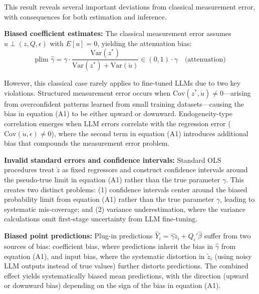 \documentclass[11pt]{article}
\begin{document}
This result reveals several important deviations from classical measurement error, with consequences for both estimation and inference.

\textbf{Biased coefficient estimates:} The classical measurement error assumes $u \perp (z, Q, \epsilon)$ with $E[u] = 0$,
yielding the attenuation bias:
\begin{equation}
\text{plim } \hat{\gamma} = \gamma \cdot \frac{\text{Var}(z^*)}{\text{Var}(z^*) + \text{Var}(\dot{u})} \in (0,1) \cdot \gamma \quad \text{(attenuation)} \tag{A2}
\end{equation}

However, this classical case rarely applies to fine-tuned LLMs due to two key violations. 
Structured measurement error occurs when $\text{Cov}(z^*, \dot{u}) \neq 0$—arising from overconfident 
patterns learned from small training datasets—causing the bias in equation (A1) to be either upward or downward. 
Endogeneity-type correlation emerges when LLM errors correlate with the regression error ($\text{Cov}(\dot{u}, \dot{\epsilon}) \neq 0$), 
where the second term in equation (A1) introduces additional bias that compounds the measurement error problem.

\textbf{Invalid standard errors and confidence intervals:} Standard OLS procedures treat $\dot{z}$ as fixed regressors and construct confidence intervals 
around the pseudo-true limit in equation (A1) rather than the true parameter $\gamma$. 
This creates two distinct problems: (1) confidence intervals center around the biased probability limit from equation (A1)
rather than the true parameter $\gamma$, leading to systematic mis-coverage; and (2) variance underestimation,
where the variance calculations omit first-stage uncertainty from LLM fine-tuning.

\textbf{Biased point predictions:} Plug-in predictions $\hat{Y}_i = \hat{\gamma} \tilde{z}_i + Q_i'\hat{\beta}$ 
suffer from two sources of bias: coefficient bias, where predictions inherit the bias in $\hat{\gamma}$ from equation (A1),
and input bias, where the systematic distortion in $\tilde{z}_i$
(using noisy LLM outputs instead of true values) further distorts predictions. 
The combined effect yields systematically biased mean predictions, with the direction (upward or downward bias)
depending on the sign of the bias in equation (A1).
\end{document}
